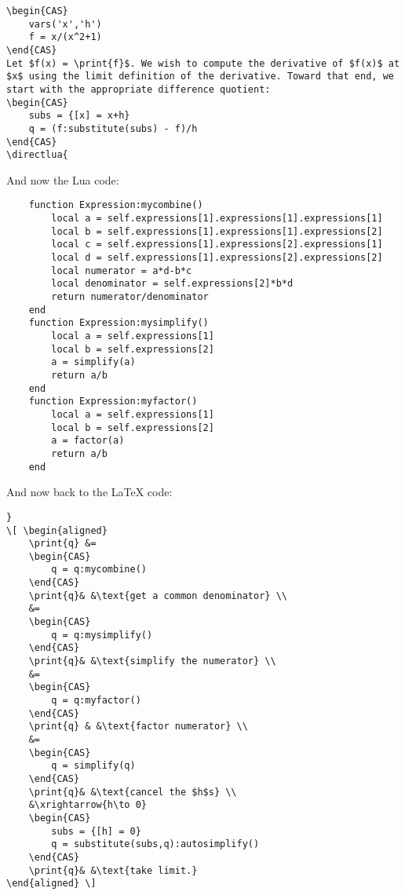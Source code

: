 \documentclass{article}
\begin{document}
\begin{verbatim}
\begin{CAS}
    vars('x','h')
    f = x/(x^2+1)
\end{CAS}
Let $f(x) = \print{f}$. We wish to compute the derivative of $f(x)$ at $x$ using the limit definition of the derivative. Toward that end, we start with the appropriate difference quotient:
\begin{CAS}
    subs = {[x] = x+h}
    q = (f:substitute(subs) - f)/h
\end{CAS}
\directlua{
\end{verbatim}
And now the Lua code:
\begin{verbatim}
    function Expression:mycombine()
        local a = self.expressions[1].expressions[1].expressions[1]
        local b = self.expressions[1].expressions[1].expressions[2]
        local c = self.expressions[1].expressions[2].expressions[1]
        local d = self.expressions[1].expressions[2].expressions[2]
        local numerator = a*d-b*c
        local denominator = self.expressions[2]*b*d
        return numerator/denominator
    end
    function Expression:mysimplify()
        local a = self.expressions[1]
        local b = self.expressions[2]
        a = simplify(a)
        return a/b 
    end
    function Expression:myfactor()
        local a = self.expressions[1]
        local b = self.expressions[2]
        a = factor(a)
        return a/b
    end
\end{verbatim}
And now back to the \LaTeX{} code:
\begin{verbatim}
}
\[ \begin{aligned} 
    \print{q} &=
    \begin{CAS}
        q = q:mycombine()
    \end{CAS}
    \print{q}& &\text{get a common denominator} \\ 
    &= 
    \begin{CAS}
        q = q:mysimplify()
    \end{CAS}
    \print{q}& &\text{simplify the numerator} \\ 
    &= 
    \begin{CAS}
        q = q:myfactor()
    \end{CAS}
    \print{q} & &\text{factor numerator} \\ 
    &=
    \begin{CAS}
        q = simplify(q)
    \end{CAS}
    \print{q}& &\text{cancel the $h$s} \\ 
    &\xrightarrow{h\to 0}
    \begin{CAS}
        subs = {[h] = 0}
        q = substitute(subs,q):autosimplify()
    \end{CAS}
    \print{q}& &\text{take limit.}
\end{aligned} \] 
\end{verbatim}
\end{document}
